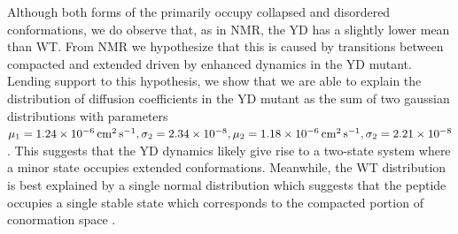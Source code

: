 Although both forms of the \gct{} primarily occupy collapsed and disordered conformations, we do observe that, as in NMR, the YD \gct{} has a slightly lower mean \diffusion than WT. From NMR we hypothesize that this is caused by transitions between compacted and extended driven by enhanced dynamics in the YD mutant. Lending support to this hypothesis, we show that we are able to explain the distribution of diffusion coefficients in the YD mutant as the sum of two gaussian distributions with parameters $\mu_1 =\SI{1.24e-6}{\dcunits}, \sigma_2= \num{2.34e-8}, \mu_2 =\SI{1.18e-6}{\dcunits}, \sigma_2= \num{2.21e-8}$ . This suggests that the YD dynamics likely give rise to a two-state system where a minor state occupies extended conformations. Meanwhile, the WT \diffusion{} distribution is best explained by a single normal distribution which suggests that the peptide occupies a single stable state which corresponds to the compacted portion of conormation space .

